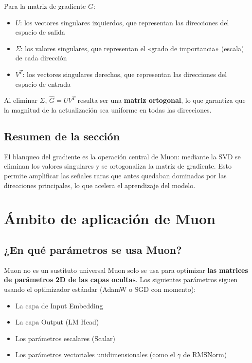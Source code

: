\documentclass[a4paper]{article}
\begin{document}
Para la matriz de gradiente $G$:
\begin{itemize}
  \item $U$: los vectores singulares izquierdos, que representan las direcciones del espacio de salida
  \item $\Sigma$: los valores singulares, que representan el «grado de importancia» (escala) de cada dirección
  \item $V^T$: los vectores singulares derechos, que representan las direcciones del espacio de entrada
\end{itemize}

Al eliminar $\Sigma$, $\hat{G} = UV^T$ resulta ser una \textbf{matriz ortogonal}, lo que garantiza que la magnitud de la actualización sea uniforme en todas las direcciones.

\subsection{Resumen de la sección}

El blanqueo del gradiente es la operación central de Muon: mediante la SVD se eliminan los valores singulares y se ortogonaliza la matriz de gradiente. Esto permite amplificar las señales raras que antes quedaban dominadas por las direcciones principales, lo que acelera el aprendizaje del modelo.
\section{Ámbito de aplicación de Muon}

\subsection{¿En qué parámetros se usa Muon?}

\begin{warningbox}{Muon no es un sustituto universal}
Muon solo se usa para optimizar \textbf{las matrices de parámetros 2D de las capas ocultas}. Los siguientes parámetros siguen usando el optimizador estándar (AdamW o SGD con momento):
\begin{itemize}
  \item La capa de Input Embedding
  \item La capa Output (LM Head)
  \item Los parámetros escalares (Scalar)
  \item Los parámetros vectoriales unidimensionales (como el $\gamma$ de RMSNorm)
\end{itemize}
\end{warningbox}
\end{document}
